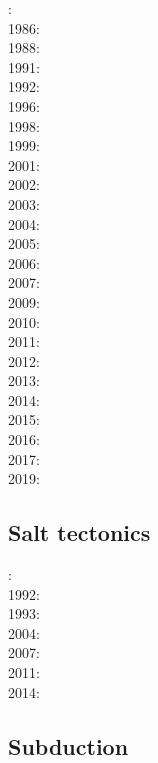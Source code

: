 : \cite{bosw85}\\
1986: \cite{hoen86b}\cite{zupf86}\cite{zupa86}\\
1988: \cite{bums88}\\
1991: \cite{trbr91}\cite{buck91}\\
1992: \cite{zieg92b}\\
1996: \cite{dusa96}\cite{beda96}\\
1998: \cite{rafm98}\\
1999: \cite{brun99}\cite{bulp99}\\
2001: \cite{hupc01}\\
2002: \cite{hube02}\cite{hani02}\cite{dabm02}\\
2003: \cite{hube03}\cite{hani03}\\
2004: \cite{hier04}\\
2005: \cite{hubb05}\\
2006: \cite{tibs06}\\
2007: \cite{huha07}\\
2009: \cite{agcz09}\\
2010: \cite{aubh10}\\
2011: \cite{alht11}\\
2012: \cite{alht12}\cite{brps12}\\
2013: \cite{alhf13}\cite{brau13}\\
2014: \cite{hebr14}\cite{lige14}\cite{brun14}\\
2015: \cite{nabu15}\\
2016: \cite{olbm16}\cite{jekm16}\cite{zwsn16}\\
2017: \cite{lemh17}\\
2019: \cite{lisp19}\cite{zwsb19}

\subsection*{Salt tectonics}

: \cite{tars91}\\
1992: \cite{zaju92}\\
1993: \cite{nabr93}\\
2004: \cite{istt04}\\
2007: \cite{huja07}\\
2011: \cite{brfo11}\\
2014: \cite{bakp14}

\subsection*{Subduction}


